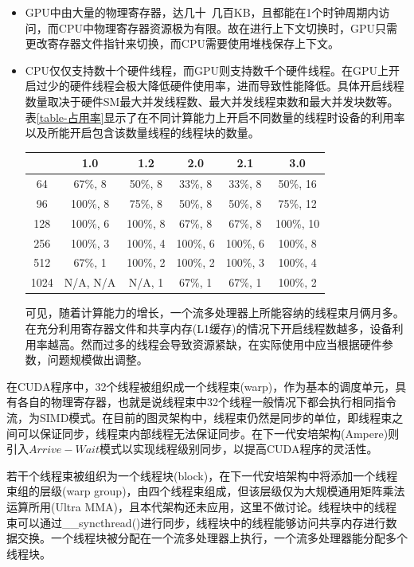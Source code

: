 \begin{itemize}
	\item GPU中由大量的物理寄存器，达几十~几百KB，且都能在1个时钟周期内访问，而CPU中物理寄存器资源极为有限。故在进行上下文切换时，GPU只需更改寄存器文件指针来切换，而CPU需要使用堆栈保存上下文。
	\item CPU仅仅支持数十个硬件线程，而GPU则支持数千个硬件线程。在GPU上开启过少的硬件线程会极大降低硬件使用率，进而导致性能降低。具体开启线程数量取决于硬件SM最大并发线程数、最大并发线程束数和最大并发块数等。表\ref{table-占用率}显示了在不同计算能力上开启不同数量的线程时设备的利用率以及所能开启包含该数量线程的线程块的数量。\\
	\begin{center}
	\begin{tabular}{cccccc}
		\toprule
			&	1.0	&1.2	&2.0	&2.1	&3.0 \\
		\midrule
		64	&	67\%, 8		&	50\%, 8		&	33\%, 8		&	33\%, 8		&	50\%, 16	\\
		96	&	100\%, 8	&	75\%, 8		&	50\%, 8		&	50\%, 8		&	75\%, 12	\\
		128	&	100\%, 6	&	100\%, 8	&	67\%, 8		&	67\%, 8		&	100\%, 10	\\
		256	&	100\%, 3	&	100\%, 4	&	100\%, 6	&	100\%, 6	&	100\%, 8	\\
		512	&	67\%, 1		&	100\%, 2	&	100\%, 2	&	100\%, 3	&	100\%, 4	\\
		1024&	N/A, N/A	&	N/A, 1		&	67\%, 1		&	67\%, 1		&	100\%, 2	\\
		
		\bottomrule
	\end{tabular} \label{table-占用率}
	\end{center}
	可见，随着计算能力的增长，一个流多处理器上所能容纳的线程束月俩月多。在充分利用寄存器文件和共享内存(L1缓存)的情况下开启线程数越多，设备利用率越高。然而过多的线程会导致资源紧缺，在实际使用中应当根据硬件参数，问题规模做出调整。
\end{itemize}
\par 在CUDA程序中，32个线程被组织成一个线程束(warp)，作为基本的调度单元，具有各自的物理寄存器，也就是说线程束中32个线程一般情况下都会执行相同指令流，为SIMD模式。在目前的图灵架构中，线程束仍然是同步的单位，即线程束之间可以保证同步，线程束内部线程无法保证同步。在下一代安培架构(Ampere)则引入$ Arrive-Wait $模式以实现线程级别同步，以提高CUDA程序的灵活性。 
\par 若干个线程束被组织为一个线程块(block)，在下一代安培架构中将添加一个线程束组的层级(warp group)，由四个线程束组成，但该层级仅为大规模通用矩阵乘法运算所用(Ultra MMA)，且本代架构还未应用，这里不做讨论。线程块中的线程束可以通过\_\_syncthread()进行同步，线程块中的线程能够访问共享内存进行数据交换。一个线程块被分配在一个流多处理器上执行，一个流多处理器能分配多个线程块。
